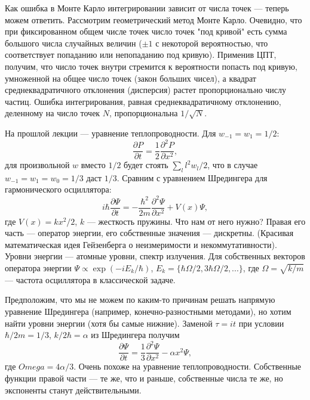 \documentclass{book}
\begin{document}
Как ошибка в Монте Карло интегрировании зависит от числа точек --- теперь можем ответить.
Рассмотрим геометрический метод Монте Карло. Очевидно, что при фиксированном общем числе точек
число точек "под кривой" есть сумма большого числа случайных величин ($\pm 1$ с некоторой вероятностью, что
соответствует попаданию или непопаданию под кривую). Применив ЦПТ, получим, что число точек внутри
стремится к вероятности попасть под кривую, умноженной на общее число точек (закон больших чисел), а квадрат
среднеквадратичного отклонения (дисперсия) растет пропорционально числу частиц. Ошибка
интегрирования, равная среднеквадратичному отклонению, деленному на число точек $N$,
пропорциональна $1 / \sqrt{N}$.

На прошлой лекции --- уравнение теплопроводности. Для $w_{-1} = w_1 = 1/2$:
\begin{equation}
    \frac{\partial P}{\partial t} = \frac{1}{2} \frac{\partial^2 P}{\partial x^2},
\end{equation}
для произвольной $w$ вместо $1/2$ будет стоять $\sum_l l^2 w_l / 2$, что в случае $w_{-1} = w_1 =
w_0 = 1/3$ даст $1/3$. Сравним с уравнением Шредингера для гармонического осциллятора:
\begin{equation}
    i \hbar \frac{\partial \Psi}{\partial t} = - \frac{\hbar^2}{2 m} \frac{\partial^2 \Psi}{\partial x^2} + V(x) \Psi,
\end{equation}
где $V(x) = k x^2 / 2$, $k$ --- жесткость пружины.
Что нам от него нужно? Правая его часть --- оператор энергии, его собственные значения ---
дискретны. (Красивая математическая идея Гейзенберга о неизмеримости и некоммутативности). Уровни
энергии --- атомные уровни, спектр излучения. Для собственных векторов оператора энергии $\Psi
\propto \exp(-i E_k / \hbar)$, $E_k = \{\hbar \Omega / 2, 3 \hbar \Omega / 2, ...\}$, где $\Omega =
\sqrt{k / m}$ --- частота осциллятора в классической задаче.

Предположим, что мы не можем по каким-то причинам решать напрямую уравнение Шредингера (например,
конечно-разностными методами), но хотим найти уровни энергии (хотя бы самые нижние). Заменой $\tau
= i t$ при условии $\hbar / 2 m = 1 / 3$, $k / 2 \hbar = \alpha$ из Шредингера получим
\begin{equation}
    \frac{\partial \Psi}{\partial t} = \frac{1}{3} \frac{\partial^2 \Psi}{\partial x^2} - \alpha
    x^2 \Psi,
\end{equation}
где $Omega = 4 \alpha / 3$.
Очень похоже на уравнение теплопроводности.
Собственные функции правой части --- те же, что и раньше, собственные числа те же, но экспоненты
станут действительными.
\end{document}
